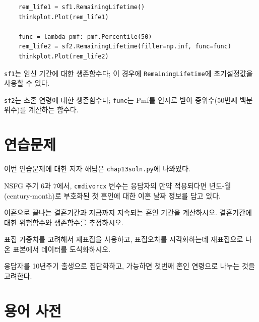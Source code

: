 \begin{verbatim}
    rem_life1 = sf1.RemainingLifetime()
    thinkplot.Plot(rem_life1)

    func = lambda pmf: pmf.Percentile(50)
    rem_life2 = sf2.RemainingLifetime(filler=np.inf, func=func)
    thinkplot.Plot(rem_life2)
\end{verbatim}

{\tt sf1}는 임신 기간에 대한 생존함수다;
이 경우에 {\tt RemainingLifetime}에 초기설정값을 사용할 수 있다.

{\tt sf2}는 초혼 연령에 대한 생존함수다;
{\tt func}는 Pmf를 인자로 받아 중위수(50번째 백분위수)를 계산하는 함수다.


\section{연습문제}

이번 연습문제에 대한 저자 해답은 \verb"chap13soln.py"에 나와있다.

\begin{exercise}

NSFG 주기 6과 7에서, {\tt cmdivorcx} 변수는 응답자의 만약 적용되다면 
년도-월(century-month)로 부호화된 첫 혼인에 대한 이혼 날짜 정보를 담고 있다.

이혼으로 끝나는 결혼기간과 지금까지 지속되는 혼인 기간을 계산하시오.
결혼기간에 대한 위험함수와 생존함수를 추정하시오.

표집 가중치를 고려해서 재표집을 사용하고, 표집오차를 시각화하는데
재표집으로 나온 표본에서 데이터를 도식화하시오.

응답자를 10년주기 출생으로 집단화하고, 가능하면 첫번째 혼인 연령으로 
나누는 것을 고려한다.

\end{exercise}


\section{용어 사전}

